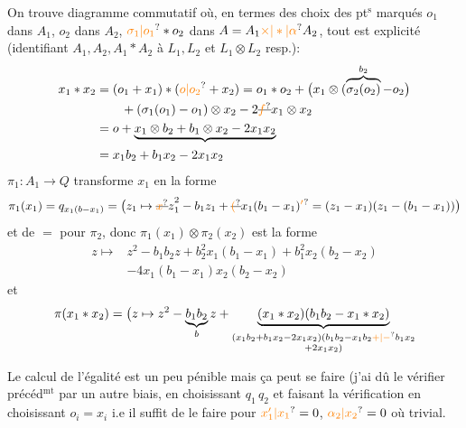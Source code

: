 On trouve diagramme commutatif
où, en termes des  choix des pt$^{\mathrm s}$ marqués
$o_1$ dans $A_1$, $o_2$ dans $A_2$, $\unsure{\sigma_1|o_1}*o_2$ dans $A=A_1\unsure{\times|*|\alpha}A_2$,
tout est explicité (identifiant $A_1,A_2,A_1*A_2$ à
$L_1,L_2$ et $L_1\otimes L_2$ resp.):
\[
\begin{aligned}
x_1*x_2&=(o_1+x_1)*(\unsure{o|o_2}+x_2)
=o_1*o_2+\bigl(x_1\otimes(\overbrace{\sigma_2(o_2)}^{b_2}-o_2\bigr)\\
&\qquad+(\sigma_1(o_1)-o_1)\otimes x_2-2\deleted{\unsure{f}}x_1\otimes x_2\\
&=o+\underbrace{x_1\otimes b_2+b_1\otimes x_2-2x_1x_2}\\
&=x_1b_2+b_1x_2-2x_1x_2
\end{aligned}
\]
$\pi_1:A_1\longrightarrow Q$ transforme $x_1$ en la forme
\[
\pi_1(x_1)=q_{x_1(b-x_1)}
=\bigl(z_1\mapsto {\deleted{\unsure{x}}z}_1^2-b_1z_1+
\deleted{\unsure{(}}x_1(b_1-x_1)\unsure{'}=(z_1-x_1)(z_1-(b_1-x_1))\bigr)
\]
et de $=$ pour $\pi_2$, donc
$\pi_1(x_1)\otimes\pi_2(x_2)$ est la forme
\[
\begin{aligned}
z\longmapsto{}&z^2-b_1b_2z+b_2^2x_1(b_1-x_1)+b_1^2x_2(b_2-x_2)\\
&-4x_1(b_1-x_1)x_2(b_2-x_2)
\end{aligned}
\]
et
\[
\pi(x_1*x_2)=\bigl(z\mapsto z^2-\underbrace{b_1b_2}_{b}z+
\underbrace{(x_1*x_2)(b_1b_2-x_1*x_2)}_{\substack{(x_1b_2+b_1x_2-2x_1x_2)(b_1b_2-x_1b_2\unsure{+|-}b_1x_2\\{}+2x_1x_2)}}
\]

Le calcul de l'égalité est un peu pénible
mais ça peut se faire (j'ai dû le
vérifier précéd$^{\mathrm{mt}}$ par un autre biais,
en choisissant $q_1\,q_2$ et faisant la vérification
en choisissant $o_i=x_i$  i.e
il suffit de le faire pour $\unsure{x_1'|x_1}=0$, $\unsure{\alpha_2|x_2}=0$
où  trivial.

